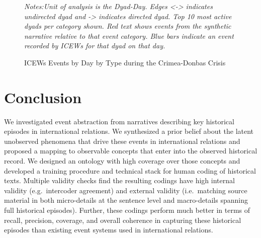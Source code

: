 \documentclass{article}
\begin{document}
\begin{figure}[H]
\caption{ ICEWs Events by Day by Type during the Crimea-Donbas Crisis \label{fig:p_precision_icews}}
\textit{Notes:Unit of analysis is the Dyad-Day. Edges <-> indicates undirected dyad and -> indicates directed dyad. Top 10 most active dyads per category shown. Red text shows events from the synthetic narrative relative to that event category. Blue bars indicate an event recorded by ICEWs for that dyad on that day. }
\end{figure}
\clearpage

\hypertarget{conclusion}{%
\section{Conclusion}\label{conclusion}}

We investigated event abstraction from narratives describing key
historical episodes in international relations. We synthesized a prior
belief about the latent unobserved phenomena that drive these events in
international relations and proposed a mapping to observable concepts
that enter into the observed historical record. We designed an ontology
with high coverage over those concepts and developed a training
procedure and technical stack for human coding of historical texts.
Multiple validity checks find the resulting codings have high internal
validity (e.g.~intercoder agreement) and external validity
(i.e.~matching source material in both micro-details at the sentence
level and macro-details spanning full historical episodes). Further,
these codings perform much better in terms of recall, precision,
coverage, and overall coherence in capturing these historical episodes
than existing event systems used in international relations.
\end{document}
